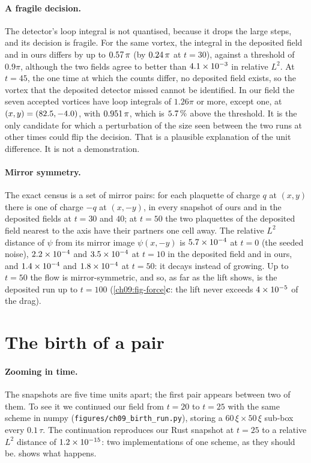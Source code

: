 \paragraph{A fragile decision.} The detector's loop integral is not quantised, because it drops the large steps, and its decision is fragile. For the same vortex, the integral in the deposited field and in ours differs by up to $0.57\,\pi$ (by $0.24\,\pi$ at $t=30$), against a threshold of $0.9\pi$, although the two fields agree to better than $4.1\times10^{-3}$ in relative $L^2$. At $t=45$, the one time at which the counts differ, no deposited field exists, so the vortex that the deposited detector missed cannot be identified. In our field the seven accepted vortices have loop integrals of $1.26\pi$ or more, except one, at $(x,y)=(82.5,-4.0)$, with $0.951\,\pi$, which is $5.7\,\%$ above the threshold. It is the only candidate for which a perturbation of the size seen between the two runs at other times could flip the decision. That is a plausible explanation of the unit difference. It is not a demonstration.

\paragraph{Mirror symmetry.} The exact census is a set of mirror pairs: for each plaquette of charge $q$ at $(x,y)$ there is one of charge $-q$ at $(x,-y)$, in every snapshot of ours and in the deposited fields at $t=30$ and $40$; at $t=50$ the two plaquettes of the deposited field nearest to the axis have their partners one cell away. The relative $L^2$ distance of $\psi$ from its mirror image $\psi(x,-y)$ is $5.7\times10^{-4}$ at $t=0$ (the seeded noise), $2.2\times10^{-4}$ and $3.5\times10^{-4}$ at $t=10$ in the deposited field and in ours, and $1.4\times10^{-4}$ and $1.8\times10^{-4}$ at $t=50$: it decays instead of growing. Up to $t=50$ the flow is mirror-symmetric, and so, as far as the lift shows, is the deposited run up to $t=100$ (\cref{ch09:fig-force}\textbf{c}: the lift never exceeds $4\times10^{-5}$ of the drag).

\section{The birth of a pair}\label{ch09:birth}

\paragraph{Zooming in time.} The snapshots are five time units apart; the first pair appears between two of them. To see it we continued our field from $t=20$ to $t=25$ with the same scheme in numpy (\texttt{figures/ch09\_birth\_run.py}), storing a $60\,\xi\times50\,\xi$ sub-box every $0.1\,\tau$. The continuation reproduces our Rust snapshot at $t=25$ to a relative $L^2$ distance of $1.2\times10^{-15}$: two implementations of one scheme, as they should be.  shows what happens.

